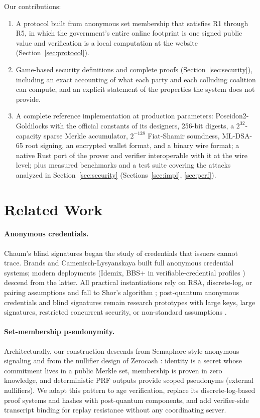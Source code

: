 \documentclass[11pt]{article}
\theoremstyle{definition}
\begin{document}
Our contributions:
\begin{enumerate}[leftmargin=2em]
\item A protocol built from anonymous set membership that satisfies R1 through R5, in
which the government's entire online footprint is one signed public value and verification
is a local computation at the website (Section~\ref{sec:protocol}).
\item Game-based security definitions and complete proofs (Section~\ref{sec:security}),
including an exact accounting of what each party and each colluding coalition can compute,
and an explicit statement of the properties the system does not provide.
\item A complete reference implementation at production parameters:
Poseidon2-Goldilocks with the official constants of its designers, 256-bit digests, a
$2^{32}$-capacity sparse Merkle accumulator, $2^{-128}$ Fiat-Shamir soundness, ML-DSA-65
root signing, an encrypted wallet format, and a binary wire format; a native Rust port of
the prover and verifier interoperable with it at the wire level; plus measured benchmarks
and a test suite covering the attacks analyzed in Section~\ref{sec:security}
(Sections~\ref{sec:impl}, \ref{sec:perf}).
\end{enumerate}

\section{Related Work}

\paragraph{Anonymous credentials.} Chaum's blind signatures \cite{chaum} began the study
of credentials that issuers cannot trace. Brands \cite{brands} and Camenisch-Lysyanskaya
\cite{cl} built full anonymous credential systems; modern deployments (Idemix, BBS+ in
verifiable-credential profiles \cite{w3cvc}) descend from the latter. All practical
instantiations rely on RSA, discrete-log, or pairing assumptions and fall to Shor's
algorithm \cite{shor}; post-quantum anonymous credentials and blind signatures remain
research prototypes with large keys, large signatures, restricted concurrent security, or
non-standard assumptions \cite{aksy,delpino}.

\paragraph{Set-membership pseudonymity.} Architecturally, our construction descends
from Semaphore-style anonymous signaling \cite{semaphore} and from the nullifier design of
Zerocash \cite{zerocash}: identity is a secret whose commitment lives in a public Merkle
set, membership is proven in zero knowledge, and deterministic PRF outputs provide scoped
pseudonyms (external nullifiers). We adapt this pattern to age verification, replace its
discrete-log-based proof systems and hashes with post-quantum components, and add
verifier-side transcript binding for replay resistance without any coordinating server.
\end{document}
